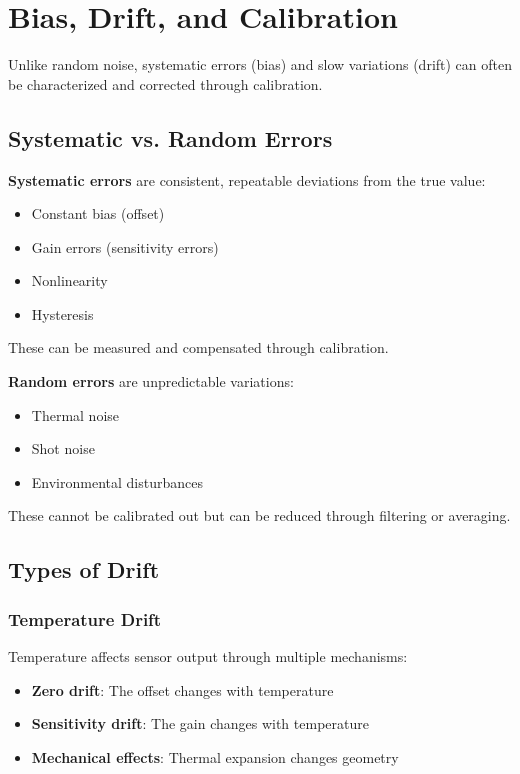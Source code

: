 \section{Bias, Drift, and Calibration}
\label{sec:bias_drift_calibration}

Unlike random noise, systematic errors (bias) and slow variations (drift) can often be characterized and corrected through calibration.

\subsection{Systematic vs. Random Errors}

\textbf{Systematic errors} are consistent, repeatable deviations from the true value:
\begin{itemize}
    \item Constant bias (offset)
    \item Gain errors (sensitivity errors)
    \item Nonlinearity
    \item Hysteresis
\end{itemize}

These can be measured and compensated through calibration.

\textbf{Random errors} are unpredictable variations:
\begin{itemize}
    \item Thermal noise
    \item Shot noise
    \item Environmental disturbances
\end{itemize}

These cannot be calibrated out but can be reduced through filtering or averaging.

\subsection{Types of Drift}

\subsubsection{Temperature Drift}

Temperature affects sensor output through multiple mechanisms:
\begin{itemize}
    \item \textbf{Zero drift}: The offset changes with temperature
    \item \textbf{Sensitivity drift}: The gain changes with temperature
    \item \textbf{Mechanical effects}: Thermal expansion changes geometry
\end{itemize}

